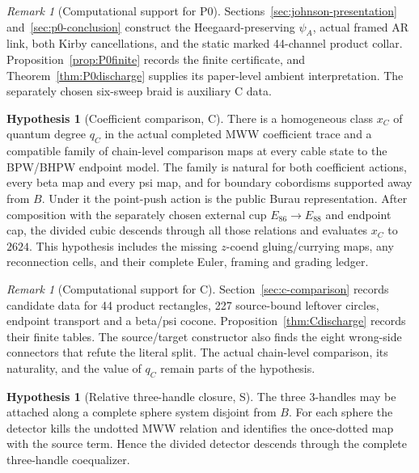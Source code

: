 \documentclass[11pt]{amsart}
\theoremstyle{definition}
\newtheorem{hypothesis}[theorem]{Hypothesis}
\theoremstyle{remark}
\newtheorem{remark}[theorem]{Remark}
\begin{document}
\begin{remark}[Computational support for P0]
Sections~\ref{sec:johnson-presentation} and~\ref{sec:p0-conclusion} construct
the Heegaard-preserving $\psi_A$, actual framed AR link, both Kirby
cancellations, and the static marked 44-channel product collar.
Proposition~\ref{prop:P0finite} records the finite certificate, and
Theorem~\ref{thm:P0discharge} supplies its paper-level ambient interpretation.
The separately chosen six-sweep braid is auxiliary C data.
\end{remark}

\begin{hypothesis}[Coefficient comparison, C]\label{hyp:P1}
There is a homogeneous class $x_C$ of quantum degree $q_C$ in the actual
completed MWW coefficient trace and a compatible family of chain-level
comparison maps at every cable state to the BPW/BHPW endpoint model.  The
family is natural for both coefficient actions, every beta map and every psi
map, and for boundary cobordisms supported away from $B$.  Under it the
point-push action is the public Burau representation.  After composition with
the separately chosen external cup $E_{86}\to E_{88}$ and endpoint cap, the
divided cubic descends through all those relations and evaluates $x_C$ to
$2624$.  This hypothesis includes the missing $z$-coend
gluing/currying maps, any reconnection cells, and their complete Euler,
framing and grading ledger.
\end{hypothesis}

\begin{remark}[Computational support for C]
Section~\ref{sec:c-comparison} records candidate data for 44 product
rectangles, 227 source-bound leftover circles, endpoint transport and a
beta/psi cocone.  Proposition~\ref{thm:Cdischarge} records their finite tables.
The source/target constructor also finds the eight wrong-side connectors that
refute the literal split.  The actual chain-level comparison, its naturality,
and the value of $q_C$ remain parts of the hypothesis.
\end{remark}

\begin{hypothesis}[Relative three-handle closure, S]\label{hyp:P2}
The three $3$-handles may be
attached along a complete sphere system disjoint from $B$.  For each sphere
the detector kills the undotted MWW relation and identifies the once-dotted
map with the source term.  Hence the divided detector descends through the
complete three-handle coequalizer.
\end{hypothesis}
\end{document}
